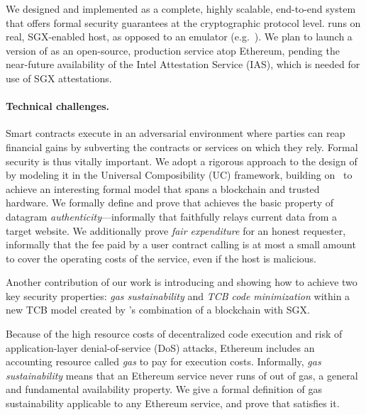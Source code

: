 We designed and implemented \tc as a complete, highly scalable, end-to-end system that offers formal security guarantees at the cryptographic protocol level. \tc runs on real, SGX-enabled host, as opposed to an emulator (e.g.~\cite{haven,VC3}). We plan to launch a version of \tc as an open-source, production service atop Ethereum, pending the near-future availability of the Intel Attestation Service (IAS), which is needed for use of SGX attestations. 


\paragraph{Technical challenges.} Smart contracts execute in an adversarial environment where parties can reap financial gains by subverting the contracts or services on which they rely. Formal security is thus vitally important. We adopt a rigorous approach to the design of \tcs by modeling it in the Universal Composibility (UC) framework, building on~\cite{hawk,sgxsok} to achieve an interesting formal model that spans a blockchain and trusted hardware. We formally define and prove that \tc achieves the basic property of datagram {\em authenticity}---informally that \tc faithfully relays current data from a target website. We additionally prove {\em fair expenditure} for an honest requester, informally that the fee paid by a user contract calling \tc is at most a small amount to cover the operating costs of the \tc service, even if the \tc host is malicious.

Another contribution of our work is introducing and showing how to achieve two key security properties: {\em gas sustainability} and {\em TCB code minimization} within a new TCB model created by \tc's combination of a blockchain with SGX. 

Because of the high resource costs of decentralized code execution and risk of application-layer denial-of-service (DoS) attacks, Ethereum includes an accounting resource called {\em gas} to pay for execution costs.  Informally, {\em gas sustainability} means that an Ethereum service never runs of out of gas, a general and fundamental availability property. We give a formal definition of gas sustainability applicable to any Ethereum service, and prove that \tc satisfies it.

